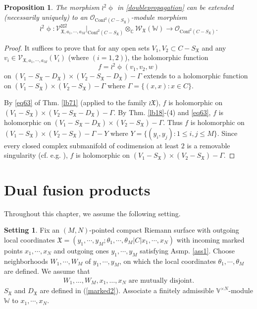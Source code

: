 \documentclass[11pt,b5paper,notitlepage]{article}
\theoremstyle{definition}
\newtheorem{sett}[df]{Setting}
\theoremstyle{plain}
\newtheorem{pp}[df]{Proposition}
\newcommand{\fk}{\mathfrak}
\newcommand{\Conf}{\mathrm{Conf}}
\newcommand{\SV}{\mathscr{V}}
\newcommand{\SX}{{S_{\fk X}}}
\newcommand{\DX}{D_{\fk X}}
\newcommand{\Vbb}{\mathbb V}
\newcommand{\Wbb}{\mathbb W}
\newcommand{\Cbb}{\mathbb C}
\newcommand{\<}{\left\langle}
\renewcommand{\>}{\right\rangle}
\newcommand{\MO}{\mathcal{O}}
\newcommand{\fx}{\mathfrak{X}}
\newcommand{\SW}{\mathscr{W}}
\numberwithin{equation}{subsection}
\begin{document}
\begin{pp}\label{anotherversionpropagation2}
The morphism $\wr^2\upphi$ in \eqref{doublepropagation} can be extended (necessarily uniquely) to an  $\MO_{\Conf^2(C-S_\fx)}$-module morphism
\begin{equation}\label{doublepropagation2}
\wr^2\upphi:\SV_{\fx,a_1,\cdots,a_M}^{\boxtimes 2}\vert_{\Conf^2(C-S_\fx)}\otimes_\Cbb \SW_\fx(\Wbb)\rightarrow \MO_{\Conf^2(C-S_\fx)}.
\end{equation}
\end{pp}
\begin{proof}
It suffices to prove that for any open sets $V_1,V_2\subset C-S_\fx$ and any  $v_i\in \SV_{\fx,a_1,\cdots,a_M}(V_i)$ (where $(i=1,2)$), the holomorphic function
\begin{equation}\label{proofdoublepropagation2}
f=\wr^2\upphi(v_1,v_2,w)
\end{equation}
on $(V_1-\SX-\DX)\times(V_2-\SX-\DX)-\Gamma$ extends to a holomorphic function on $(V_1-\SX)\times(V_2-\SX)-\Gamma$ where $\Gamma=\{(x,x):x\in C\}$. 

By \eqref{eq63} of Thm. \ref{lb71} (applied to the family $\wr\fk X$), $f$ is holomorphic on $(V_1-\SX)\times(V_2-\SX-\DX)-\Gamma$. By Thm. \ref{lb18}-(4) and \eqref{eq63}, $f$ is holomorphic on $(V_1-\SX-\DX)\times (V_2-\SX)-\Gamma$. Thus $f$ is holomorphic on $(V_1-\SX)\times(V_2-\SX)-\Gamma-Y$ where $Y=\{(y_i,y_j):1\leq i,j\leq M\}$. Since every closed complex submanifold of codimension at least $2$ is a removable singularity   (cf. e.g. \cite[Thm. 7.1.2]{GR84}), $f$ is holomorphic on $(V_1-\SX)\times(V_2-\SX)-\Gamma$.
\end{proof}















\section{Dual fusion products}


Throughout this chapter, we assume the following setting.


\begin{sett}\label{lb24}
Fix an $(M,N)$-pointed compact Riemann surface with outgoing local coordinates $\fx=(y_1,\cdots,y_M;\theta_1,\cdots,\theta_M\big|C\big|x_1,\cdots,x_N)$ with incoming marked points $x_1,\cdots,x_N$ and outgoing ones $y_1,\cdots,y_M$ satisfying Asmp. \ref{ass1}.  Choose neighborhoods $W_1,\cdots,W_M$ of $y_1,\cdots,y_M$, on which the local coordinates $\theta_1,\cdots,\theta_M$ are defined. We assume that
\begin{align}
W_1,\dots,W_M,x_1,\dots,x_N\text{ are mutually disjoint}.
\end{align}
$S_\fx$ and $D_\fx$ are defined in (\ref{marked2}). Associate a finitely admissible $\Vbb^{\times N}$-module $\Wbb$ to $x_1,\cdots,x_N$.
\end{sett}
\end{document}
